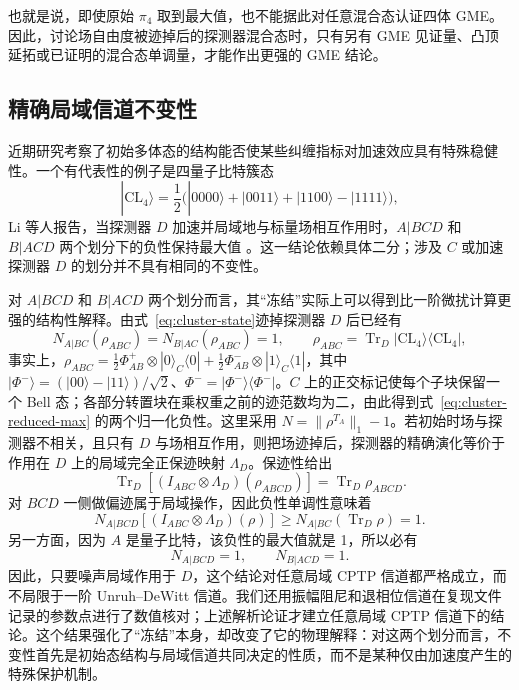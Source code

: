 \documentclass[UTF8,11pt,a4paper,fontset=none]{ctexart}
\newcommand{\Tr}{\operatorname{Tr}}
\begin{document}
也就是说，即使原始 $\pi_4$ 取到最大值，也不能据此对任意混合态认证四体 GME。因此，讨论场自由度被迹掉后的探测器混合态时，只有另有 GME 见证量、凸顶延拓或已证明的混合态单调量，才能作出更强的 GME 结论。

\subsection{精确局域信道不变性}
近期研究考察了初始多体态的结构能否使某些纠缠指标对加速效应具有特殊稳健性。一个有代表性的例子是四量子比特簇态
\begin{equation}
|\mathrm{CL}_{4}\rangle=\frac{1}{2}\bigl(|0000\rangle+|0011\rangle+|1100\rangle-|1111\rangle\bigr),
\label{eq:cluster-state}
\end{equation}
Li 等人报告，当探测器 $D$ 加速并局域地与标量场相互作用时，$A|BCD$ 和 $B|ACD$ 两个划分下的负性保持最大值 \cite{LiCluster2026}。这一结论依赖具体二分；涉及 $C$ 或加速探测器 $D$ 的划分并不具有相同的不变性。

对 $A|BCD$ 和 $B|ACD$ 两个划分而言，其“冻结”实际上可以得到比一阶微扰计算更强的结构性解释。由式~\eqref{eq:cluster-state}迹掉探测器 $D$ 后已经有
\begin{equation}
N_{A|BC}(\rho_{ABC})=N_{B|AC}(\rho_{ABC})=1,
\qquad \rho_{ABC}=\Tr_D|\mathrm{CL}_{4}\rangle\langle\mathrm{CL}_{4}|,
\label{eq:cluster-reduced-max}
\end{equation}
事实上，$\rho_{ABC}=\frac12\Phi^+_{AB}\otimes|0\rangle_C\langle0|+\frac12\Phi^-_{AB}\otimes|1\rangle_C\langle1|$，其中 $|\Phi^-\rangle=(|00\rangle-|11\rangle)/\sqrt2$、$\Phi^-=|\Phi^-\rangle\langle\Phi^-|$。$C$ 上的正交标记使每个子块保留一个 Bell 态；各部分转置块在乘权重之前的迹范数均为二，由此得到式~\eqref{eq:cluster-reduced-max} 的两个归一化负性。这里采用 $N=\|\rho^{T_A}\|_1-1$。若初始时场与探测器不相关，且只有 $D$ 与场相互作用，则把场迹掉后，探测器的精确演化等价于作用在 $D$ 上的局域完全正保迹映射 $\Lambda_D$。保迹性给出
\begin{equation}
\Tr_D[(I_{ABC}\otimes\Lambda_D)(\rho_{ABCD})]=\Tr_D\rho_{ABCD}.
\label{eq:cluster-local-channel}
\end{equation}
对 $BCD$ 一侧做偏迹属于局域操作，因此负性单调性意味着
\begin{equation}
N_{A|BCD}[(I_{ABC}\otimes\Lambda_D)(\rho)]
\ge N_{A|BC}(\Tr_D\rho)=1.
\end{equation}
另一方面，因为 $A$ 是量子比特，该负性的最大值就是 1，所以必有
\begin{equation}
N_{A|BCD}=1,
\qquad N_{B|ACD}=1.
\label{eq:cluster-exact-freezing}
\end{equation}
因此，只要噪声局域作用于 $D$，这个结论对任意局域 CPTP 信道都严格成立，而不局限于一阶 Unruh--DeWitt 信道。我们还用振幅阻尼和退相位信道在复现文件记录的参数点进行了数值核对；上述解析论证才建立任意局域 CPTP 信道下的结论。这个结果强化了“冻结”本身，却改变了它的物理解释：对这两个划分而言，不变性首先是初始态结构与局域信道共同决定的性质，而不是某种仅由加速度产生的特殊保护机制。
\end{document}
